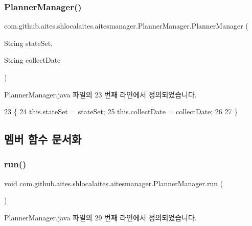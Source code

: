 \subsubsection{\texorpdfstring{Planner\+Manager()}{PlannerManager()}}
{\footnotesize\ttfamily com.\+github.\+aites.\+shlocalaites.\+aitesmanager.\+Planner\+Manager.\+Planner\+Manager (\begin{DoxyParamCaption}\item[{String}]{state\+Set,  }\item[{String}]{collect\+Date }\end{DoxyParamCaption})}



Planner\+Manager.\+java 파일의 23 번째 라인에서 정의되었습니다.


\begin{DoxyCode}
23                                                               \{
24         this.stateSet = stateSet;
25         this.collectDate = collectDate;
26     
27     \}
\end{DoxyCode}


\subsection{멤버 함수 문서화}
\mbox{\label{classcom_1_1github_1_1aites_1_1shlocalaites_1_1aitesmanager_1_1_planner_manager_a1f82642f05240aeac42eabfb3f650e26}} 
\subsubsection{\texorpdfstring{run()}{run()}}
{\footnotesize\ttfamily void com.\+github.\+aites.\+shlocalaites.\+aitesmanager.\+Planner\+Manager.\+run (\begin{DoxyParamCaption}{ }\end{DoxyParamCaption})}



Planner\+Manager.\+java 파일의 29 번째 라인에서 정의되었습니다.


